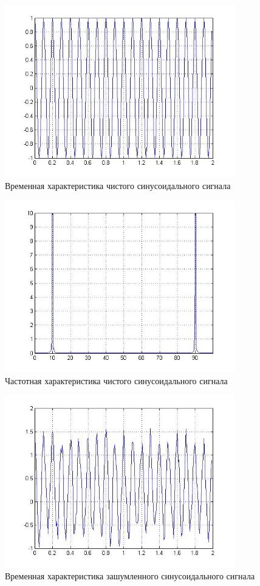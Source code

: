 \documentclass[10pt,a4paper]{article}
\begin{document}
\begin{figure}[h]
\centering
\includegraphics[width=10cm]{1.jpg} 
\caption{Временная характеристика чистого синусоидального сигнала} 
\label{fig.0} 
\end{figure}
\newpage
\begin{figure}[h]
\centering
\includegraphics[width=10cm]{2.jpg} 
\caption{Частотная характеристика чистого синусоидального сигнала} 
\label{fig.1} 
\end{figure}
\begin{figure}[h]
\centering
\includegraphics[width=10cm]{3.jpg} 
\caption{Временная характеристика зашумленного синусоидального сигнала} 
\label{fig.2} 
\end{figure}
\end{document}
